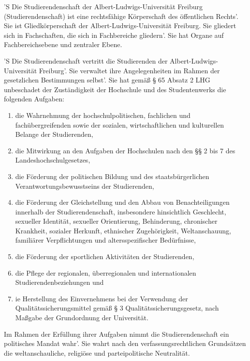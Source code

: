 \documentclass[fontsize=12pt,parskip=half]{scrartcl}
\begin{document}

\begin{contract}
  \label{Abs1:Stud}

  'S Die Studierendenschaft der Albert-Ludwigs-Universität Freiburg
  (Studierendenschaft) ist eine rechtsfähige Körperschaft des öffentlichen
  Rechts'. Sie ist Gliedkörperschaft der Albert-Ludwigs-Universität Freiburg. Sie
  gliedert sich in Fachschaften, die sich in Fachbereiche gliedern'. Sie hat
  Organe auf Fachbereichsebene und zentraler Ebene. \label{Abs1:Stud.Beschreibung}

  'S Die Studierendenschaft vertritt die Studierenden der
  Albert-Ludwigs-Universität Freiburg'. Sie verwaltet ihre Angelegenheiten im
  Rahmen der gesetzlichen Bestimmungen selbst'. Sie hat gemäß § 65 Absatz 2 LHG
  unbeschadet der Zuständigkeit der Hochschule und des Studentenwerks die
  folgenden Aufgaben: \label{Abs1:Stud:Vertretung}
  \begin{enumerate}[\qquad 1.]
    \item die Wahrnehmung der hochschulpolitischen, fachlichen und
      fachübergreifenden sowie der sozialen, wirtschaftlichen und kulturellen
      Belange der Studierenden,
    \item die Mitwirkung an den Aufgaben der Hochschulen nach den §§ 2 bis 7
      des Landeshochschulgesetzes,
    \item die Förderung der politischen Bildung und des staatsbürgerlichen
      Verantwortungsbewusstseins der Studierenden,
    \item die Förderung der Gleichstellung und den Abbau von Benachteiligungen
      innerhalb der Studierendenschaft, insbesondere hinsichtlich Geschlecht,
      sexueller Identität, sexueller Orientierung, Behinderung, chronischer
      Krankheit, sozialer Herkunft, ethnischer Zugehörigkeit, Weltanschauung,
      familiärer Verpflichtungen und altersspezifischer Bedürfnisse,
    \item die Förderung der sportlichen Aktivitäten der Studierenden,
    \item die Pflege der regionalen, überregionalen und internationalen
      Studierendenbeziehungen und
    \item ie Herstellung des Einvernehmens bei der Verwendung der
      Qualitätssicherungsmittel gemäß § 3 Qualitätssicherungsgesetz, nach
      Maßgabe der Grundordnung der Universität.
  \end{enumerate}
  \label{Abs1:Stud.polMan}
  Im Rahmen der Erfüllung ihrer Aufgaben nimmt die Studierendenschaft ein
  politisches Mandat wahr'. Sie wahrt nach den verfassungsrechtlichen Grundsätzen
  die weltanschauliche, religiöse und parteipolitische Neutralität.


\end{contract}
\end{document}
